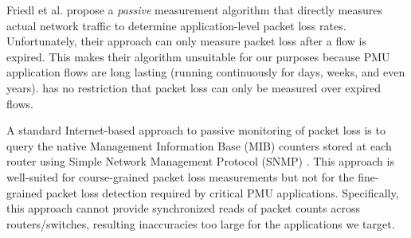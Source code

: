 
Friedl et al. \cite{Friedl09} propose a \emph{passive} measurement algorithm that directly measures actual network traffic to determine application-level packet loss rates. 
Unfortunately, their approach can only measure packet loss after a flow is expired.  This makes their algorithm unsuitable for our purposes because
PMU application flows are long lasting (running continuously for days, weeks, and even years).  \pcnt has no restriction that packet loss can only be measured over expired flows.






A standard Internet-based approach to passive monitoring of packet loss is to query the native Management Information Base (MIB) counters stored at each router using Simple Network
Management Protocol (SNMP) \cite{Barford04}. This approach is well-suited for course-grained packet loss measurements but not for the fine-grained packet loss detection required
by critical PMU applications.  Specifically, this approach cannot provide synchronized reads of packet counts across routers/switches, resulting inaccuracies too large for the applications
we target.

